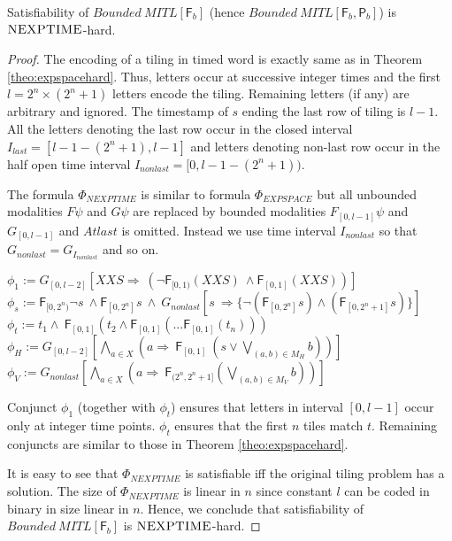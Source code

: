 \documentclass{llncs}
\newcommand{\class}{\textsc}
\newcommand{\fut}{\textsf{F}}
\newcommand{\past}{\textsf{P}}
\newcommand{\bmitlfp}{\mbox{$\mathit{Bounded ~MITL[\fut_b,\past_b]}$}}
\newcommand{\mitlfpb}{\bmitlfp}
\newcommand{\mitlfb}{\mbox{$\mathit{Bounded ~MITL[\fut_b]}$}}
\newcommand{\nexptime}{\mbox{$\class{NEXPTIME}$}}
\begin{document}
\begin{theorem} 
\label{theo:nexptimehard} Satisfiability of $\mitlfb$ (hence
$\mitlfpb$)  is \nexptime-hard.
\end{theorem}
\begin{proof}
The encoding of a tiling in timed word is exactly same as in Theorem \ref{theo:expspacehard}. Thus, letters occur at successive integer times and
the first $l=2^n\times (2^n+1)$ letters encode
the tiling. Remaining letters (if any) are arbitrary and ignored. 
The timestamp of $s$ ending the last row of tiling is $l-1$. All the letters denoting the last row occur in the closed interval $I_{last} = [l-1-(2^n+1),l-1]$ and letters denoting non-last row occur in the half open time interval $I_{nonlast} =[0,l-1-(2^n+1))$. 

The formula $\Phi_{NEXPTIME}$ is  similar to formula $\Phi_{EXPSPACE}$ but
all unbounded modalities $F \psi$ and $G\psi$ are replaced by bounded modalities $F_{[0,l-1]} \psi$ and $G_{[0,l-1]}$ and $Atlast$ is omitted. Instead we use time interval $I_{nonlast}$ so that $G_{nonlast}=G_{I_{nonlast}}$ and so on.
\medskip

\noindent
$\phi_1 := G_{[0,l-2]} [XXS \Rightarrow~ (\neg\fut_{[0,1)}(XXS) ~ \land \fut_{[0,1]}(XXS))]$\\
$\phi_s := \fut_{[0,2^n)} \neg s ~\land \fut_{[0,2^n]} s ~\land~ 
    G_{nonlast} [ s ~\Rightarrow \{\neg(\fut_{[0,2^n]}s) \land      (\fut_{[0,2^n+1]}s)\}]$\\
$\phi_t := t_1 \land ~ \fut_{[0,1]} (t_2 \land \fut_{[0,1]}( ...\fut_{[0,1]}(t_n)))$\\
$\phi_H := G_{[0,l-2]}[\bigwedge\limits_{a\in X}(a\Rightarrow~ \fut_{[0,1]} ~(s \lor \bigvee\limits_{(a,b) \in M_H} b))]$\\
$\phi_V := G_{nonlast}[\bigwedge\limits_{a\in X}(a\Rightarrow~ \fut_{(2^n,2^n+1]}(\bigvee\limits_{(a,b) \in M_V} b))]$
\medskip

Conjunct $\phi_1$ (together with $\phi_t$) ensures that letters in interval $[0,l-1]$ occur only at integer time points. $\phi_t$ ensures that the first $n$ tiles match $t$. Remaining conjuncts are similar to those in Theorem \ref{theo:expspacehard}.


It is easy to see that $\Phi_{NEXPTIME}$ is satisfiable iff the original tiling problem 
has a solution. The size of $\Phi_{NEXPTIME}$ is linear in $n$ since constant $l$ 
can be coded in binary in size linear in $n$. Hence, we  conclude that satisfiability 
of $\mitlfb$ is \nexptime-hard. 
\end{proof}
\end{document}
